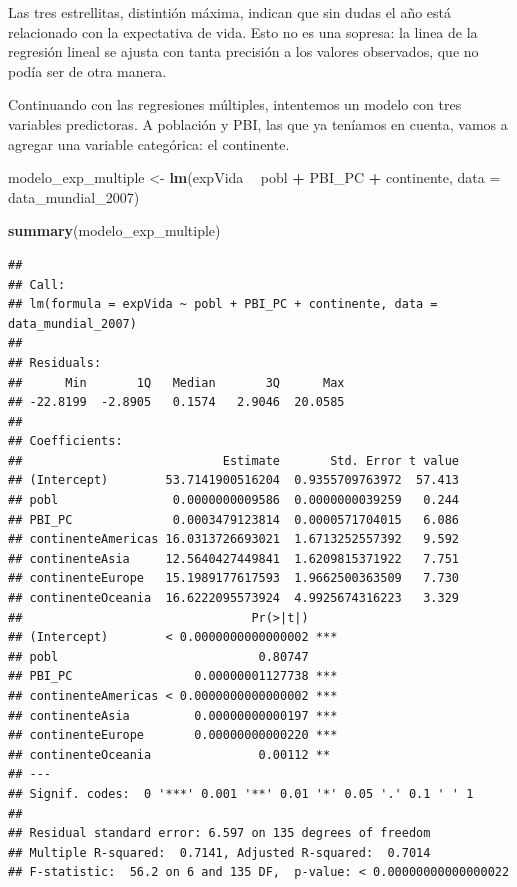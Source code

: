 \documentclass[spanish,]{book}
\newenvironment{Shaded}{\begin{snugshade}}{\end{snugshade}}
\newcommand{\DataTypeTok}[1]{\textcolor[rgb]{0.13,0.29,0.53}{#1}}
\newcommand{\DecValTok}[1]{\textcolor[rgb]{0.00,0.00,0.81}{#1}}
\newcommand{\KeywordTok}[1]{\textcolor[rgb]{0.13,0.29,0.53}{\textbf{#1}}}
\newcommand{\NormalTok}[1]{#1}
\newcommand{\OperatorTok}[1]{\textcolor[rgb]{0.81,0.36,0.00}{\textbf{#1}}}
\newcommand{\StringTok}[1]{\textcolor[rgb]{0.31,0.60,0.02}{#1}}
\begin{document}
Las tres estrellitas, distintión máxima, indican que sin dudas el año está relacionado con la expectativa de vida. Esto no es una sopresa: la linea de la regresión lineal se ajusta con tanta precisión a los valores observados, que no podía ser de otra manera.

Continuando con las regresiones múltiples, intentemos un modelo con tres variables predictoras. A población y PBI, las que ya teníamos en cuenta, vamos a agregar una variable categórica: el continente.

\begin{Shaded}
\begin{Highlighting}[]
\NormalTok{modelo_exp_multiple <-}\StringTok{ }\KeywordTok{lm}\NormalTok{(expVida }\OperatorTok{~}\StringTok{ }\NormalTok{pobl }\OperatorTok{+}\StringTok{ }\NormalTok{PBI_PC }\OperatorTok{+}\StringTok{ }\NormalTok{continente, }\DataTypeTok{data =}\NormalTok{ data_mundial_}\DecValTok{2007}\NormalTok{)}

\KeywordTok{summary}\NormalTok{(modelo_exp_multiple)}
\end{Highlighting}
\end{Shaded}

\begin{verbatim}
## 
## Call:
## lm(formula = expVida ~ pobl + PBI_PC + continente, data = data_mundial_2007)
## 
## Residuals:
##      Min       1Q   Median       3Q      Max 
## -22.8199  -2.8905   0.1574   2.9046  20.0585 
## 
## Coefficients:
##                            Estimate       Std. Error t value
## (Intercept)        53.7141900516204  0.9355709763972  57.413
## pobl                0.0000000009586  0.0000000039259   0.244
## PBI_PC              0.0003479123814  0.0000571704015   6.086
## continenteAmericas 16.0313726693021  1.6713252557392   9.592
## continenteAsia     12.5640427449841  1.6209815371922   7.751
## continenteEurope   15.1989177617593  1.9662500363509   7.730
## continenteOceania  16.6222095573924  4.9925674316223   3.329
##                                Pr(>|t|)    
## (Intercept)        < 0.0000000000000002 ***
## pobl                            0.80747    
## PBI_PC                 0.00000001127738 ***
## continenteAmericas < 0.0000000000000002 ***
## continenteAsia         0.00000000000197 ***
## continenteEurope       0.00000000000220 ***
## continenteOceania               0.00112 ** 
## ---
## Signif. codes:  0 '***' 0.001 '**' 0.01 '*' 0.05 '.' 0.1 ' ' 1
## 
## Residual standard error: 6.597 on 135 degrees of freedom
## Multiple R-squared:  0.7141, Adjusted R-squared:  0.7014 
## F-statistic:  56.2 on 6 and 135 DF,  p-value: < 0.00000000000000022
\end{verbatim}
\end{document}

